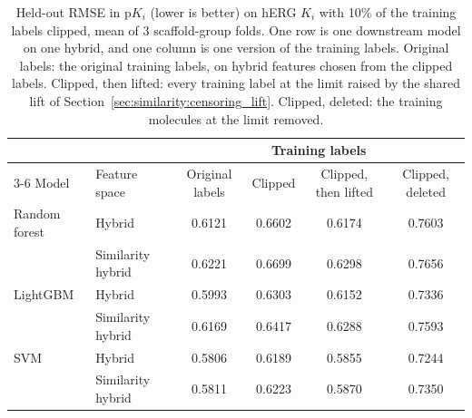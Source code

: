 \begin{table}[htbp]
\centering
\small
\begin{tabular}{@{}llcccc@{}}
\toprule
 & & \multicolumn{4}{c}{Training labels} \\
\cmidrule(l){3-6}
Model & Feature space & Original labels & Clipped & Clipped, then lifted & Clipped, deleted \\
\midrule
Random forest & Hybrid & 0.6121 & 0.6602 & 0.6174 & 0.7603 \\
 & Similarity hybrid & 0.6221 & 0.6699 & 0.6298 & 0.7656 \\
\midrule
LightGBM & Hybrid & 0.5993 & 0.6303 & 0.6152 & 0.7336 \\
 & Similarity hybrid & 0.6169 & 0.6417 & 0.6288 & 0.7593 \\
\midrule
SVM & Hybrid & 0.5806 & 0.6189 & 0.5855 & 0.7244 \\
 & Similarity hybrid & 0.5811 & 0.6223 & 0.5870 & 0.7350 \\
\bottomrule
\end{tabular}
\caption[Correcting clipped labels on hERG $K_i$ in the two hybrids]{Held-out RMSE in p$K_i$ (lower is better) on hERG $K_i$ with 10\% of the training labels clipped, mean of 3 scaffold-group folds. One row is one downstream model on one hybrid, and one column is one version of the training labels. Original labels: the original training labels, on hybrid features chosen from the clipped labels. Clipped, then lifted: every training label at the limit raised by the shared lift of Section~\ref{sec:similarity:censoring_lift}. Clipped, deleted: the training molecules at the limit removed.}
\label{tab:ch6prelim_censor_hybrid}
\end{table}

